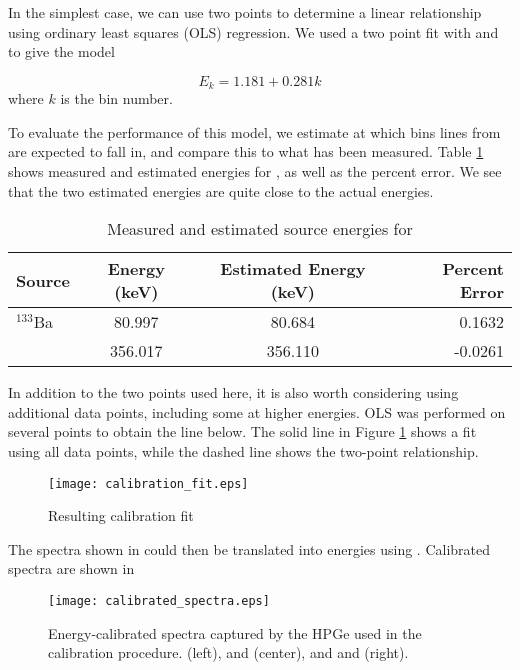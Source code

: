In the simplest case, we can use two points to determine a linear relationship using ordinary least squares (OLS) regression.
We used a two point fit with  and  to give the model

\begin{equation}
\label{eq:cal}
E_k = 1.181 + 0.281k
\end{equation}
where $k$ is the bin number.


To evaluate the performance of this model, we estimate at which bins lines from  are expected to fall in, and compare this to what has been measured.
Table \ref{tab:barium} shows measured and estimated energies for , as well as the percent error.
We see that the two estimated energies are quite close to the actual energies.

\begin{table}
\renewcommand{\arraystretch}{1.3}
\caption{Measured and estimated source energies for }
\label{tab:barium}
\centering
\begin{tabular}{l|c|c|r}
\hline
\bfseries Source & \bfseries Energy (keV) & \bfseries Estimated Energy (keV) & \bfseries Percent Error\\
\hline\hline
      $^{133}$Ba    &  80.997    & 80.684   &  0.1632 \\
                    &  356.017   & 356.110  &  -0.0261 \\
\hline
\end{tabular}
\end{table}

In addition to the two points used here, it is also worth considering using additional data points, including some at higher energies.
OLS was performed on several points to obtain the line below.
The solid line in Figure \ref{fig:fit} shows a fit using all data points, while the dashed line shows the two-point relationship.

\begin{figure}
\centering
\texttt{[image: calibration\_fit.eps]}
\caption{Resulting calibration fit}
\label{fig:fit}
\end{figure}

The spectra shown in  could then be translated into energies using .
Calibrated spectra are shown in 
\begin{figure*}[t!]
\centering
\texttt{[image: calibrated\_spectra.eps]}
\caption{Energy-calibrated spectra captured by the HPGe used in the calibration procedure.  (left),  and  (center), and  and  (right).}
\label{fig:spectra_cal}
\end{figure*}
